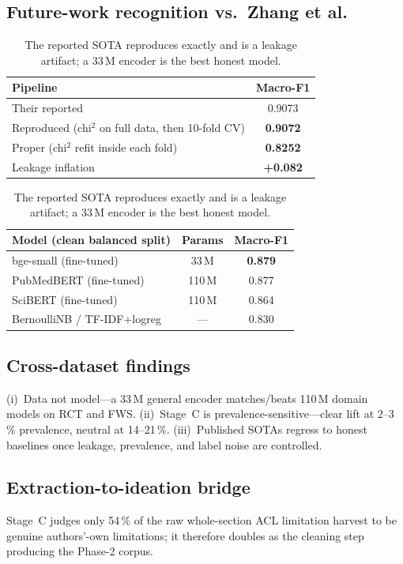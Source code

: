 \documentclass[10pt,a4paper]{article}
\newcommand{\done}[1]{\textcolor{green!45!black}{#1}}
\begin{document}
\subsection{Future-work recognition vs.\ Zhang et al.}
\begin{table}[h]\centering\small
\begin{tabular}{@{}lc@{}}
\toprule
Pipeline & Macro-F1 \\ \midrule
Their reported & 0.9073 \\
Reproduced (chi$^2$ on full data, then 10-fold CV) & \textbf{0.9072} \\
Proper (chi$^2$ refit inside each fold) & \textbf{0.8252} \\
Leakage inflation & \textbf{+0.082} \\
\bottomrule
\end{tabular}\hfill
\begin{tabular}{@{}lcc@{}}
\toprule
Model (clean balanced split) & Params & Macro-F1 \\ \midrule
bge-small (fine-tuned) & 33\,M & \textbf{0.879} \\
PubMedBERT (fine-tuned) & 110\,M & 0.877 \\
SciBERT (fine-tuned) & 110\,M & 0.864 \\
BernoulliNB / TF-IDF+logreg & --- & 0.830 \\
\bottomrule
\end{tabular}
\caption{\done{The reported SOTA reproduces exactly and is a leakage artifact; a 33\,M encoder
is the best honest model.}}
\end{table}

\subsection{Cross-dataset findings}
\done{(i)~Data not model}---a 33\,M general encoder matches/beats 110\,M domain models on RCT and
FWS. \done{(ii)~Stage~C is prevalence-sensitive}---clear lift at 2--3\,\% prevalence, neutral at
14--21\,\%. \done{(iii)~Published SOTAs regress to honest baselines} once leakage, prevalence,
and label noise are controlled.

\subsection{Extraction-to-ideation bridge}
\done{Stage~C judges only 54\,\% of the raw whole-section ACL limitation harvest to be genuine
authors'-own limitations}; it therefore doubles as the cleaning step producing the Phase-2 corpus.
\end{document}
